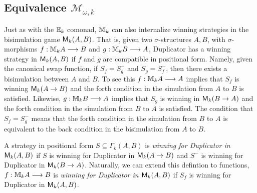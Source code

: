 \subsection{Equivalence $\mathcal{M}_{\omega,k}$}
Just as with the ${\mathbb{E}_{k}}$ comonad, ${\mathbb{M}_{k}}$ can also internalize winning strategies in the bisimulation game ${\mathsf{M}_{k}(A,B)}$. That is, given two $\sigma$-structures $A,B$, with $\sigma$-morphisms $f:{\mathbb{M}_{k}A} \longrightarrow B$ and $g:{\mathbb{M}_{k}B} \longrightarrow A$, Duplicator has a winning strategy in ${\mathsf{M}_{k}(A,B)}$ if $f$ and $g$ are compatible in positional form. Namely, given the canonical swap function, if $S_{f} = S_{g}^{-}$ and $S_{g} = S_{f}^{-}$, then there exists a bisimulation between $A$ and $B$. To see this $f:{\mathbb{M}_{k}A} \longrightarrow A$ implies that $S_{f}$ is winning ${\mathsf{M}_{k}(A \rightarrow B)}$ and the forth condition in the simulation from $A$ to $B$ is satisfied. Likewise, $g:{\mathbb{M}_{k}B} \longrightarrow A$ implies that $S_{g}$ is winning in ${\mathsf{M}_{k}(B \rightarrow A)}$ and the forth condition in the simulation from $B$ to $A$ is satisfied. The condition that $S_{f} = S_{g}^{-}$ means that the forth condition in the simulation from $B$ to $A$ is equivalent to the back condition in the bisimulation from $A$ to $B$. 
\begin{defn}
A strategy in positional form $S \subseteq \Gamma_{k}(A,B)$ is \textit{winning for Duplicator in ${\mathsf{M}_{k}(A,B)}$} if $S$ is winning for Duplicator in ${\mathsf{M}_{k}(A \rightarrow B)}$ and $S^{-}$ is winning for Duplicator in ${\mathsf{M}_{k}(B \rightarrow A)}$. Naturally, we can extend this defintion to functions, $f:{\mathbb{M}_{k}A} \longrightarrow B$ is \textit{winning for Duplicator in ${\mathsf{M}_{k}(A,B)}$} if $S_{f}$ is winning for Duplicator in ${\mathsf{M}_{k}(A,B)}$.
\end{defn}
